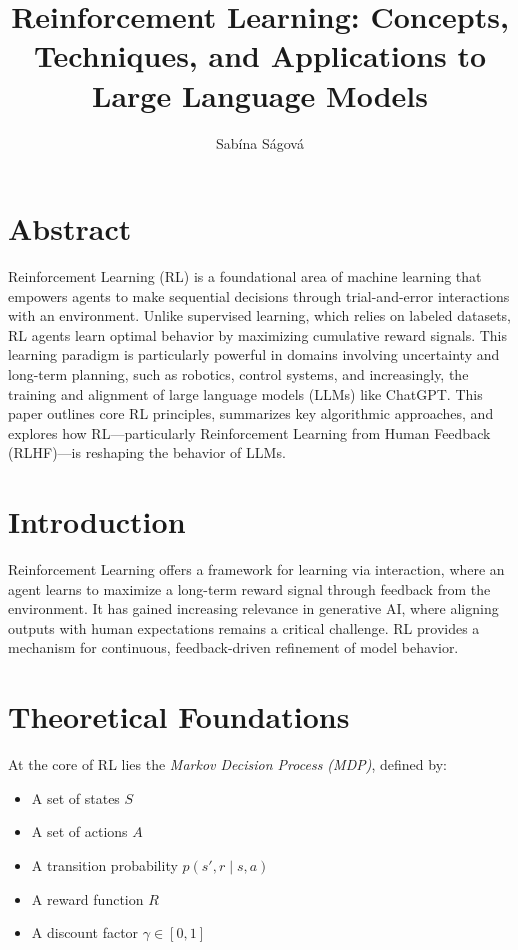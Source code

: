 \documentclass[11pt]{article}
\title{\textbf{Reinforcement Learning: Concepts, Techniques, and Applications to Large Language Models}}
\author{Sabína Ságová}
\date{}
\begin{document}
\maketitle

\section*{Abstract}
Reinforcement Learning (RL) is a foundational area of machine learning that empowers agents to make sequential decisions through trial-and-error interactions with an environment. Unlike supervised learning, which relies on labeled datasets, RL agents learn optimal behavior by maximizing cumulative reward signals. This learning paradigm is particularly powerful in domains involving uncertainty and long-term planning, such as robotics, control systems, and increasingly, the training and alignment of large language models (LLMs) like ChatGPT. This paper outlines core RL principles, summarizes key algorithmic approaches, and explores how RL---particularly Reinforcement Learning from Human Feedback (RLHF)---is reshaping the behavior of LLMs.

\section{Introduction}
Reinforcement Learning offers a framework for learning via interaction, where an agent learns to maximize a long-term reward signal through feedback from the environment. It has gained increasing relevance in generative AI, where aligning outputs with human expectations remains a critical challenge. RL provides a mechanism for continuous, feedback-driven refinement of model behavior.

\section{Theoretical Foundations}
At the core of RL lies the \textit{Markov Decision Process (MDP)}, defined by:
\begin{itemize}[noitemsep]
    \item A set of states $S$
    \item A set of actions $A$
    \item A transition probability $p(s', r \mid s, a)$
    \item A reward function $R$
    \item A discount factor $\gamma \in [0,1]$
\end{itemize}
\end{document}
